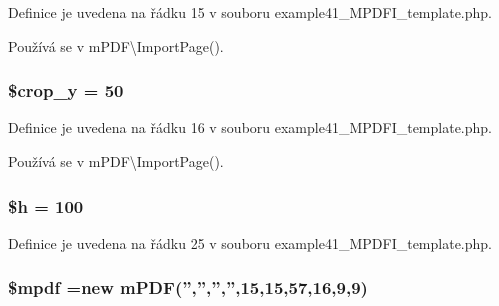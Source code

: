 Definice je uvedena na řádku 15 v souboru example41\-\_\-\-M\-P\-D\-F\-I\-\_\-template.\-php.



Používá se v m\-P\-D\-F\textbackslash{}\-Import\-Page().

\hypertarget{example41___m_p_d_f_i__template_8php_a732cfa94d9525477ce702fb63383c295}{
\subsubsection[{\$crop\-\_\-y}]{\setlength{\rightskip}{0pt plus 5cm}\$crop\-\_\-y = 50}}\label{example41___m_p_d_f_i__template_8php_a732cfa94d9525477ce702fb63383c295}


Definice je uvedena na řádku 16 v souboru example41\-\_\-\-M\-P\-D\-F\-I\-\_\-template.\-php.



Používá se v m\-P\-D\-F\textbackslash{}\-Import\-Page().

\hypertarget{example41___m_p_d_f_i__template_8php_ab00da9d5d8bd5b6b944793e093860aff}{
\subsubsection[{\$h}]{\setlength{\rightskip}{0pt plus 5cm}\$h = 100}}\label{example41___m_p_d_f_i__template_8php_ab00da9d5d8bd5b6b944793e093860aff}


Definice je uvedena na řádku 25 v souboru example41\-\_\-\-M\-P\-D\-F\-I\-\_\-template.\-php.

\hypertarget{example41___m_p_d_f_i__template_8php_ad028f81910d6cbab9b184d2214b3a8f8}{
\subsubsection[{\$mpdf}]{\setlength{\rightskip}{0pt plus 5cm}\$mpdf =new {\bf m\-P\-D\-F}('','','','',15,15,57,16,9,9)}}\label{example41___m_p_d_f_i__template_8php_ad028f81910d6cbab9b184d2214b3a8f8}


